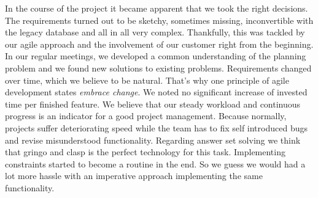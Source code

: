 \documentclass[12pt]{article} %
\begin{document}
In the course of the project it became apparent that we took the right decisions.
The requirements turned out to be sketchy, sometimes missing, inconvertible with the legacy database and all in all very complex.
Thankfully, this was tackled by our agile approach and the involvement of our customer right from the beginning.
In our regular meetings, we developed a common understanding of the planning problem and we found new solutions to existing problems.
Requirements changed over time, which we believe to be natural.
That's why one principle of agile development states \emph{embrace change}.
We noted no significant increase of invested time per finished feature.
We believe that our steady workload and continuous progress is an indicator for a good project management.
Because normally, projects suffer deteriorating speed while the team has to fix self introduced bugs and revise misunderstood functionality.
Regarding answer set solving we think that gringo and clasp is the perfect technology for this task.
Implementing constraints started to become a routine in the end.
So we guess we would had a lot more hassle with an imperative approach implementing the same functionality.





\end{document}
